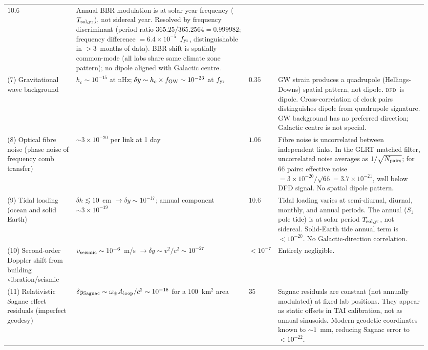 \documentclass[aps,prd,twocolumn,superscriptaddress,nofootinbib]{revtex4-2}
\newcommand{\DFD}{\textsc{dfd}}
\begin{document}
\begin{longtable}{p{3.2cm}p{2.2cm}p{1.8cm}p{3.5cm}}
$10.6$ &
Annual BBR modulation is at solar-year frequency ($T_{\rm sol,yr}$), not sidereal year. Resolved by frequency discriminant (period ratio $365.25/365.2564 = 0.999982$; frequency difference $= 6.4\times10^{-5}$~$f_{\rm yr}$, distinguishable in $>3$~months of data). BBR shift is spatially common-mode (all labs share same climate zone pattern); no dipole aligned with Galactic centre. \\
\addlinespace
(7) Gravitational wave background &
$h_c \sim 10^{-15}$ at nHz; $\delta y \sim h_c \times f_{\rm GW} \sim 10^{-23}$ at $f_{\rm yr}$ &
$0.35$ &
GW strain produces a quadrupole (Hellings-Downs) spatial pattern, not dipole. \DFD\ is dipole. Cross-correlation of clock pairs distinguishes dipole from quadrupole signature. GW background has no preferred direction; Galactic centre is not special. \\
\addlinespace
(8) Optical fibre noise (phase noise of frequency comb transfer) &
$\sim 3\times10^{-20}$ per link at 1 day &
$1.06$ &
Fibre noise is uncorrelated between independent links. In the GLRT matched filter, uncorrelated noise averages as $1/\sqrt{N_{\rm pairs}}$; for 66 pairs: effective noise $= 3\times10^{-20}/\sqrt{66} = 3.7\times10^{-21}$, well below DFD signal. No spatial dipole pattern. \\
\addlinespace
(9) Tidal loading (ocean and solid Earth) &
$\delta h \lesssim 10$~cm $\to \delta y \sim 10^{-17}$; annual component $\sim 3\times10^{-19}$ &
$10.6$ &
Tidal loading varies at semi-diurnal, diurnal, monthly, and annual periods. The annual ($S_1$ pole tide) is at solar period $T_{\rm sol,yr}$, not sidereal. Solid-Earth tide annual term is $< 10^{-20}$. No Galactic-direction correlation. \\
\addlinespace
(10) Second-order Doppler shift from building vibration/seismic &
$v_{\rm seismic} \sim 10^{-6}$~m/s $\to \delta y \sim v^2/c^2 \sim 10^{-27}$ &
$<10^{-7}$ &
Entirely negligible. \\
\addlinespace
(11) Relativistic Sagnac effect residuals (imperfect geodesy) &
$\delta y_{\rm Sagnac} \sim \omega_\oplus A_{\rm loop}/c^2 \sim 10^{-18}$ for a $100$~km$^2$ area &
$35$ &
Sagnac residuals are constant (not annually modulated) at fixed lab positions. They appear as static offsets in TAI calibration, not as annual sinusoids. Modern geodetic coordinates known to $\sim 1$~mm, reducing Sagnac error to $< 10^{-22}$. \\
\end{longtable}
\end{document}

